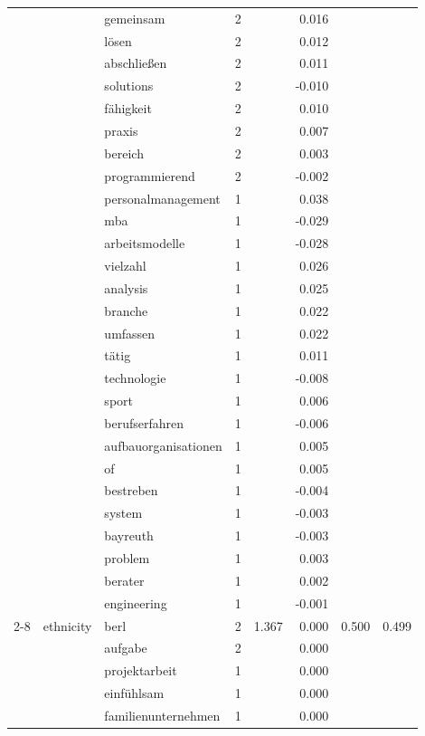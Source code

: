 \begin{longtable}{lllrrr@{\hspace{1em}}r@{\hspace{1em}}r}
 &  & gemeinsam & 2 &  & 0.016 &  &  \\
 &  & lösen & 2 &  & 0.012 &  &  \\
 &  & abschließen & 2 &  & 0.011 &  &  \\
 &  & solutions & 2 &  & -0.010 &  &  \\
 &  & fähigkeit & 2 &  & 0.010 &  &  \\
 &  & praxis & 2 &  & 0.007 &  &  \\
 &  & bereich & 2 &  & 0.003 &  &  \\
 &  & programmierend & 2 &  & -0.002 &  &  \\
 &  & personalmanagement & 1 &  & 0.038 &  &  \\
 &  & mba & 1 &  & -0.029 &  &  \\
 &  & arbeitsmodelle & 1 &  & -0.028 &  &  \\
 &  & vielzahl & 1 &  & 0.026 &  &  \\
 &  & analysis & 1 &  & 0.025 &  &  \\
 &  & branche & 1 &  & 0.022 &  &  \\
 &  & umfassen & 1 &  & 0.022 &  &  \\
 &  & tätig & 1 &  & 0.011 &  &  \\
 &  & technologie & 1 &  & -0.008 &  &  \\
 &  & sport & 1 &  & 0.006 &  &  \\
 &  & berufserfahren & 1 &  & -0.006 &  &  \\
 &  & aufbauorganisationen & 1 &  & 0.005 &  &  \\
 &  & of & 1 &  & 0.005 &  &  \\
 &  & bestreben & 1 &  & -0.004 &  &  \\
 &  & system & 1 &  & -0.003 &  &  \\
 &  & bayreuth & 1 &  & -0.003 &  &  \\
 &  & problem & 1 &  & 0.003 &  &  \\
 &  & berater & 1 &  & 0.002 &  &  \\
 &  & engineering & 1 &  & -0.001 &  &  \\
\cmidrule(lr){2-8}
 & ethnicity & berl & 2 & 1.367 & 0.000 & 0.500 & 0.499 \\
 &  & aufgabe & 2 &  & 0.000 &  &  \\
 &  & projektarbeit & 1 &  & 0.000 &  &  \\
 &  & einfühlsam & 1 &  & 0.000 &  &  \\
 &  & familienunternehmen & 1 &  & 0.000 &  &  \\

\end{longtable}
